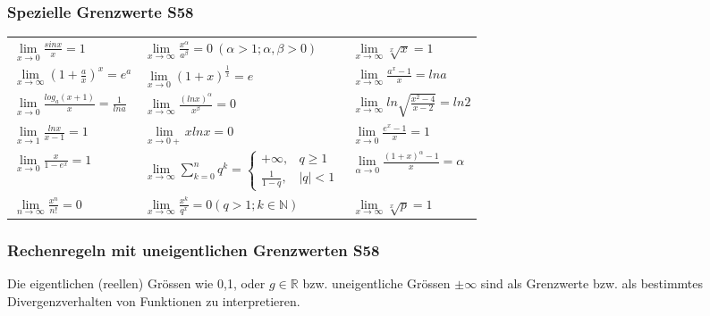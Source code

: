 \subsubsection{Spezielle Grenzwerte \color{red}S58}

\begin{tabulary}{14cm}{LLL}
	
	$\lim\limits_{x\to 0}\frac{sinx}{x}=1$							& $\lim\limits_{x\to\infty}\frac{x^{\alpha}}{a^{\beta}}=0 \ (\alpha>1;\alpha,\beta>0)$ 	& 
	$\lim\limits_{x\to\infty}\sqrt[x]{x}=1$\\
	
	$\lim\limits_{x\to\infty}\left(1+\frac{a}{x}\right)^{x}=e^{a}$	& $\lim\limits_{x\to 0}(1+x)^{\frac{1}{x}}=e$ 											& 	$\lim\limits_{x\to\infty}\frac{a^{x}-1}{x}=lna$		\\ 
	
	$\lim\limits_{x\to 0}\frac{log_{a}(x+1)}{x}=\frac{1}{ln a}$ 	& $\lim\limits_{x\to\infty}\frac{(lnx)^{\alpha}}{x^{\beta}}=0$ 							& 				$\lim\limits_{x\to\infty}ln\sqrt{\frac{x^{2}-4}{x-2}}=ln2$	\\
	
	$\lim\limits_{x\to 1}\frac{lnx}{x-1}=1$ 						& $\lim\limits_{x\to 0+}x ln x=0$ 														&
	$\lim\limits_{x\to 0}\frac{e^{x}-1}{x}=1$\\
	
	$\lim\limits_{x\to 0}\frac{x}{1-e^{x}}=1$						& $\lim\limits_{x\to \infty} \sum\limits_{k=0}^{n} q^{k} = \begin{cases} +\infty, 		& 
	q \geq 1 \\ \frac{1}{1-q},& |q|<1 \end{cases}  $ &	
	$\lim\limits_{\alpha \to0}\frac{(1+x)^{\alpha}-1}{x}=\alpha$				\\
	
	$\lim\limits_{n\to\infty}\frac{x^{n}}{n!}=0$ 					& $\lim\limits_{x\to\infty}\frac{x^{k}}{q^{x}}=0 (q>1;k\in\mathbb{N})$ 					&
	$\lim\limits_{x\to\infty}\sqrt[x]{p}=1$	\\
\end{tabulary}

\subsubsection{Rechenregeln mit uneigentlichen Grenzwerten \color{red}S58}
Die eigentlichen (reellen) Grössen wie 0,1, oder $g\in \mathbb R$ bzw. uneigentliche Grössen $\pm\infty$ sind als Grenzwerte bzw. als bestimmtes Divergenzverhalten von Funktionen zu interpretieren.


